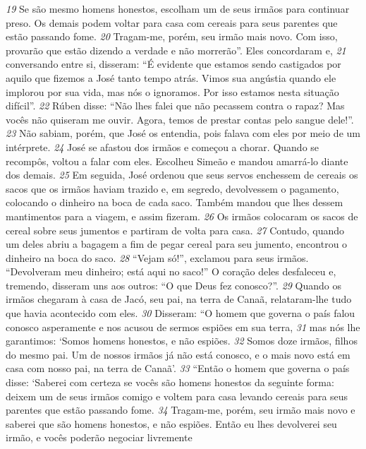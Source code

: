 \textit{\tiny 19}
Se são
mesmo homens honestos, escolham um de seus irmãos para continuar preso. Os
demais podem voltar para casa com cereais para seus parentes que estão
passando fome. 
\textit{\tiny 20}
Tragam-me, porém, seu irmão mais novo. Com isso, provarão
que estão dizendo a verdade e não morrerão”.
   Eles concordaram e, 
\textit{\tiny 21}
conversando entre si, disseram: “É evidente que estamos
sendo castigados por aquilo que fizemos a José tanto tempo atrás. Vimos sua
angústia quando ele implorou por sua vida, mas nós o ignoramos. Por isso
estamos nesta situação difícil”.
\textit{\tiny 22}
Rúben disse: “Não lhes falei que não pecassem contra o rapaz? Mas vocês não
quiseram me ouvir. Agora, temos de prestar contas pelo sangue dele!”.
\textit{\tiny 23}
Não sabiam, porém, que José os entendia, pois falava com eles por meio de
um intérprete. 
\textit{\tiny 24}
José se afastou dos irmãos e começou a chorar. Quando se
recompôs, voltou a falar com eles. Escolheu Simeão e mandou amarrá-lo diante
dos demais.
\textit{\tiny 25}
Em seguida, José ordenou que seus servos enchessem de cereais os sacos que
os irmãos haviam trazido e, em segredo, devolvessem o pagamento, colocando o
dinheiro na boca de cada saco. Também mandou que lhes dessem mantimentos
para a viagem, e assim fizeram. 
\textit{\tiny 26}
Os irmãos colocaram os sacos de cereal sobre
seus jumentos e partiram de volta para casa.
\textit{\tiny 27}
Contudo, quando um deles abriu a bagagem a fim de pegar cereal para seu
jumento, encontrou o dinheiro na boca do saco. 
\textit{\tiny 28}
“Vejam só!”, exclamou para
seus irmãos. “Devolveram meu dinheiro; está aqui no saco!” O coração deles
desfaleceu e, tremendo, disseram uns aos outros: “O que Deus fez conosco?”.
\textit{\tiny 29}
Quando os irmãos chegaram à casa de Jacó, seu pai, na terra de Canaã,
relataram-lhe tudo que havia acontecido com eles. 
\textit{\tiny 30}
Disseram: “O homem que
governa o país falou conosco asperamente e nos acusou de sermos espiões em sua
terra, 
\textit{\tiny 31}
mas nós lhe garantimos: ‘Somos homens honestos, e não espiões.
\textit{\tiny 32}
Somos doze irmãos, filhos do mesmo pai. Um de nossos irmãos já não está
conosco, e o mais novo está em casa com nosso pai, na terra de Canaã’.
\textit{\tiny 33}
“Então o homem que governa o país disse: ‘Saberei com certeza se vocês são
homens honestos da seguinte forma: deixem um de seus irmãos comigo e voltem
para casa levando cereais para seus parentes que estão passando fome. 
\textit{\tiny 34}
Tragam-me, porém, seu irmão mais novo e saberei que são homens honestos, e não
espiões. Então eu lhes devolverei seu irmão, e vocês poderão negociar livremente
